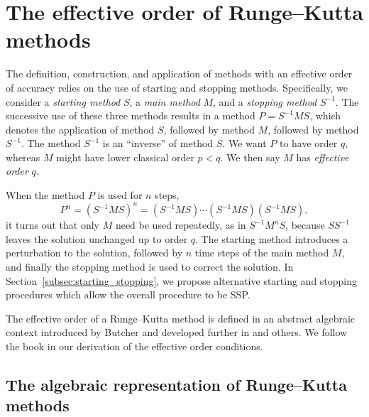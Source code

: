 \documentclass{siamltex}  %
\begin{document}
\section{The effective order of Runge--Kutta methods}\label{sec:Algebraic_RK}
The definition, construction, and application of methods with an
effective order of accuracy relies on the use of starting and stopping
methods.
Specifically, we consider a \emph{starting method} $S$, a \emph{main method} $M$, 
and a \emph{stopping method} $S^{-1}$.
The successive use of these three methods results in a method $P =
S^{-1}MS$, which denotes the application of method $S$, followed by
method $M$, followed by method $S^{-1}$.
The method $S^{-1}$ is an ``inverse'' of method $S$.
We want $P$ to have order $q$, whereas $M$ might have lower classical
order $p < q$.
We then say $M$ has \emph{effective order} $q$.

When the method $P$ is used for $n$ steps,
$$P^n = (S^{-1}MS)^n = (S^{-1}MS) \cdots (S^{-1}MS) (S^{-1}MS),$$
it turns out that only $M$ need be used repeatedly, as in
$S^{-1} M^n S$,
because $S S^{-1}$ leaves the solution unchanged up to order $q$.
The starting method introduces a perturbation to the solution,
followed by $n$ time steps of the main method $M$, and finally the
stopping method is used to correct the solution.
In Section~\ref{subsec:starting_stopping}, we propose alternative
starting and stopping procedures which allow the overall procedure to
be SSP.

The effective order of a Runge--Kutta method is defined in an abstract 
algebraic context introduced by Butcher \cite{Butcher1969} and developed 
further in \cite{Butcher1972, Hairer1974, Butcher1996, Butcher1998} and 
others.
We follow the book \cite{Butcher2008_book} in our derivation of the effective 
order conditions.

\subsection{The algebraic representation of Runge--Kutta methods}\label{subsec:Algebraic_representation}
\end{document}
